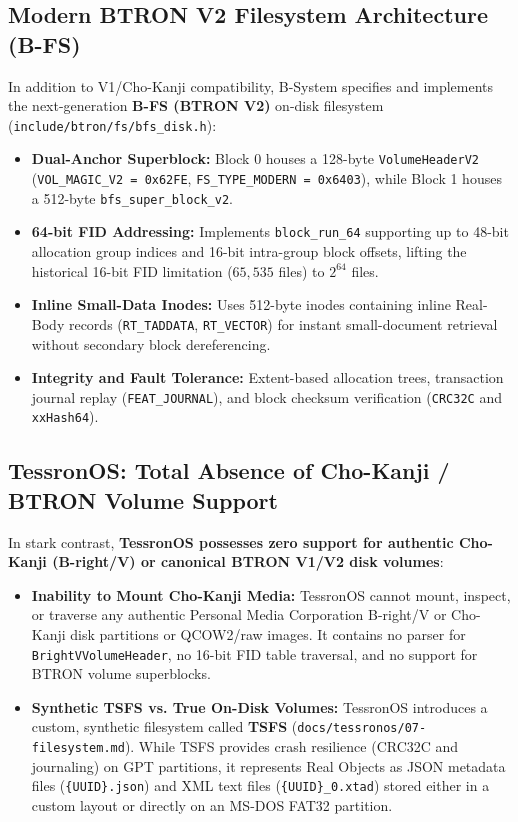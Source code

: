 \documentclass[10pt,journal,compsoc,twocolumn]{article}
\begin{document}
\subsection{Modern BTRON V2 Filesystem Architecture (B-FS)}
In addition to V1/Cho-Kanji compatibility, B-System specifies and implements the next-generation \textbf{B-FS (BTRON V2)} on-disk filesystem (\texttt{include/btron/fs/bfs\_disk.h}):
\begin{itemize}[leftmargin=*]
    \item \textbf{Dual-Anchor Superblock:} Block 0 houses a 128-byte \texttt{VolumeHeaderV2} (\texttt{VOL\_MAGIC\_V2 = 0x62FE}, \texttt{FS\_TYPE\_MODERN = 0x6403}), while Block 1 houses a 512-byte \texttt{bfs\_super\_block\_v2}.
    \item \textbf{64-bit FID Addressing:} Implements \texttt{block\_run\_64} supporting up to 48-bit allocation group indices and 16-bit intra-group block offsets, lifting the historical 16-bit FID limitation ($65,535$ files) to $2^{64}$ files.
    \item \textbf{Inline Small-Data Inodes:} Uses 512-byte inodes containing inline Real-Body records (\texttt{RT\_TADDATA}, \texttt{RT\_VECTOR}) for instant small-document retrieval without secondary block dereferencing.
    \item \textbf{Integrity and Fault Tolerance:} Extent-based allocation trees, transaction journal replay (\texttt{FEAT\_JOURNAL}), and block checksum verification (\texttt{CRC32C} and \texttt{xxHash64}).
\end{itemize}

\subsection{TessronOS: Total Absence of Cho-Kanji / BTRON Volume Support}
In stark contrast, \textbf{TessronOS possesses zero support for authentic Cho-Kanji (B-right/V) or canonical BTRON V1/V2 disk volumes}:
\begin{itemize}[leftmargin=*]
    \item \textbf{Inability to Mount Cho-Kanji Media:} TessronOS cannot mount, inspect, or traverse any authentic Personal Media Corporation B-right/V or Cho-Kanji disk partitions or QCOW2/raw images. It contains no parser for \texttt{BrightVVolumeHeader}, no 16-bit FID table traversal, and no support for BTRON volume superblocks.
    \item \textbf{Synthetic TSFS vs. True On-Disk Volumes:} TessronOS introduces a custom, synthetic filesystem called \textbf{TSFS} (\texttt{docs/tessronos/07-filesystem.md}). While TSFS provides crash resilience (CRC32C and journaling) on GPT partitions, it represents Real Objects as JSON metadata files (\texttt{\{UUID\}.json}) and XML text files (\texttt{\{UUID\}\_0.xtad}) stored either in a custom layout or directly on an MS-DOS FAT32 partition.
\end{itemize}
\end{document}

